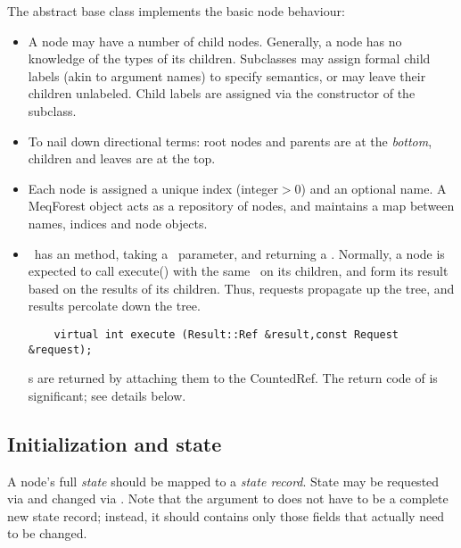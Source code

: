 \documentclass[10pt]{article}
\begin{document}
  The abstract base class  implements the basic node behaviour:

  \begin{itemize}

  \item A node may have a number of child nodes. Generally, a node has no
    knowledge of the types of its children. Subclasses may assign formal child
    labels (akin to argument names) to specify semantics, or may leave their
    children unlabeled. Child labels are assigned via the constructor of the
    subclass.

  \item To nail down directional terms: root nodes and parents are at the {\em
    bottom}, children and leaves are at the top. 

  \item Each node is assigned a unique index (integer$>$0) and an optional name. A
    MeqForest object acts as a repository of nodes, and maintains a map between
    names, indices and node objects.

  \item \Node\ has an  method, taking a \Request\ parameter,
    and returning a \Result. Normally, a node is expected to call execute()
    with the same \Request\ on its children, and form its result based on the
    results of its children. Thus, requests propagate up the tree, and results
    percolate down the tree.

\begin{verbatim}
    virtual int execute (Result::Ref &result,const Request &request);
\end{verbatim}

    \Result{}s are returned by attaching them to the CountedRef. The return code
    of  is significant; see details below.

  \end{itemize}

\subsection{Initialization and state}
  
  A node's full {\em state} should be mapped to a {\em state record}. State may
  be requested via  and changed via . Note that
  the argument to  does not have to be a complete new state
  record; instead, it should contains only those fields that actually need to
  be changed. 
\end{document}
